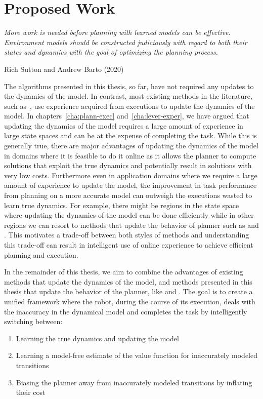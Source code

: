 \chapter{Proposed Work}
\label{cha:proposed-work}

\epigraph{\textit{More work is needed before planning with learned
    models can be effective. Environment models should be
    constructed judiciously with regard to both their states and
    dynamics with the goal of optimizing the planning process.}}{Rich
  Sutton and Andrew Barto (2020)}

The algorithms presented in this thesis, so
far, have not required any updates to the dynamics of the model. In
contrast, most existing methods in the literature, such
as~\cite{DBLP:journals/ml/KearnsS02, DBLP:journals/jmlr/BrafmanT02,
  DBLP:conf/atal/JongS07, 
  DBLP:journals/pami/DeisenrothFR15, DBLP:conf/icml/AbbeelQN06, 
  DBLP:conf/aaai/Jiang18, rastogi2018sample}, use experience
acquired from executions to update the dynamics of the model. In
chapters~\ref{cha:plann-exec} and~\ref{cha:lever-exper}, we have
argued that updating the dynamics of the model requires a large amount
of experience in large state spaces and can be at the expense of
completing the task. While this is generally true, there are major
advantages of updating the dynamics of the model in domains where it
is feasible to do it online as it allows the planner to compute
solutions that exploit the true dynamics and potentially result in
solutions with very low costs. Furthermore even in application domains
where we require a large amount of experience to update the model,
the improvement in task performance from planning on a more accurate
model can outweigh the executions wasted to learn true dynamics. For
example, there might be regions in the state space where updating the
dynamics of the model can be done efficiently while in other regions
we can resort to methods that update the behavior of planner such as
\cmax{} and \cmaxpp{}. This motivates a trade-off between both styles
of methods and understanding this trade-off can result in intelligent
use of online experience to achieve efficient planning and execution.


In the remainder of this thesis, we aim to combine the advantages of
existing methods that update the dynamics of the model, and methods
presented in this thesis that update the behavior of the planner, like
\cmax{} and \cmaxpp{}. The goal is to create a unified framework where
the robot, during the course of its execution, deals with the
inaccuracy in the dynamical model and completes the task by
intelligently switching between: 
\begin{enumerate}
\item Learning the true dynamics and updating the model
\item Learning a model-free estimate of the value function for
  inaccurately modeled transitions
\item Biasing the planner away from inaccurately modeled transitions
  by inflating their cost
\end{enumerate}

